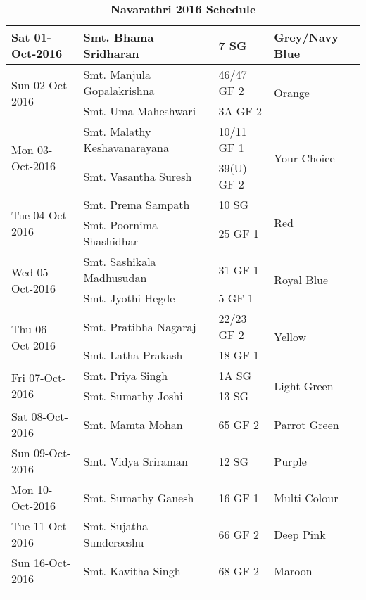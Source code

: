 \documentclass[12pt]{article}
\begin{document}
\begin{center}
\begin{longtable}{|p{}|p{}|p{}|p{}|}
Sat 01-Oct-2016&Smt. Bhama Sridharan&7 SG&Grey/Navy Blue\\\hline
\multirow{2}{*}{Sun 02-Oct-2016}&Smt. Manjula Gopalakrishna&46/47 GF 2&\multirow{2}{*}{Orange}\\\cline{2-3}
&Smt. Uma Maheshwari&3A GF 2&\\\hline
\multirow{2}{*}{Mon 03-Oct-2016}&Smt. Malathy Keshavanarayana&10/11 GF 1&\multirow{2}{*}{Your Choice}\\\cline{2-3}
&Smt. Vasantha Suresh&39(U) GF 2&\\\hline
\multirow{2}{*}{Tue 04-Oct-2016}&Smt. Prema Sampath&10 SG&\multirow{2}{*}{Red}\\\cline{2-3}
&Smt. Poornima Shashidhar&25 GF 1&\\\hline
\multirow{2}{*}{Wed 05-Oct-2016}&Smt. Sashikala Madhusudan&31 GF 1&\multirow{2}{*}{Royal Blue}\\\cline{2-3}
&Smt. Jyothi Hegde&5 GF 1&\\\hline
\multirow{2}{*}{Thu 06-Oct-2016}&Smt. Pratibha Nagaraj&22/23 GF 2&\multirow{2}{*}{Yellow}\\\cline{2-3}
&Smt. Latha Prakash&18 GF 1&\\\hline
\multirow{2}{*}{Fri 07-Oct-2016}&Smt. Priya Singh&1A SG&\multirow{2}{*}{Light Green}\\\cline{2-3}
&Smt. Sumathy Joshi&13 SG&\\\hline
Sat 08-Oct-2016&Smt. Mamta Mohan&65 GF 2&Parrot Green\\\hline
Sun 09-Oct-2016&Smt. Vidya Sriraman&12 SG&Purple\\\hline
Mon 10-Oct-2016&Smt. Sumathy Ganesh&16 GF 1&Multi Colour\\\hline
Tue 11-Oct-2016&Smt. Sujatha Sunderseshu&66 GF 2&Deep Pink\\\hline
Sun 16-Oct-2016&Smt. Kavitha Singh&68 GF 2&Maroon\\\hline
\caption*{\textbf{Navarathri 2016 Schedule}}
\label{table:programme2016}
\end{longtable}
\end{center}
\end{document}
